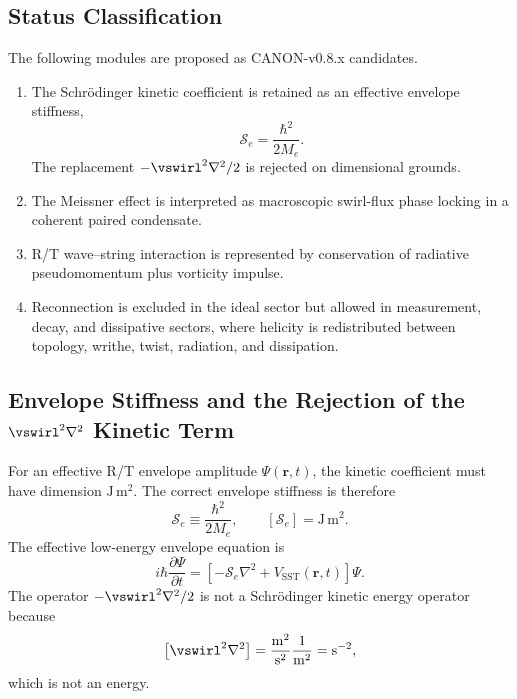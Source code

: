     \subsection{Status Classification}
        
        The following modules are proposed as CANON-v0.8.x candidates.
        
        \begin{enumerate}
            \item The Schrödinger kinetic coefficient is retained as an effective
            envelope stiffness,
            \[
                \mathcal S_e=\frac{\hbar^2}{2M_e}.
            \]
            The replacement \(-\vswirl^2\nabla^2/2\) is rejected on dimensional grounds.
            
            \item The Meissner effect is interpreted as macroscopic swirl-flux phase
            locking in a coherent paired condensate.
            
            \item R/T wave--string interaction is represented by conservation of
            radiative pseudomomentum plus vorticity impulse.
            
            \item Reconnection is excluded in the ideal sector but allowed in
            measurement, decay, and dissipative sectors, where helicity is redistributed
            between topology, writhe, twist, radiation, and dissipation.
        \end{enumerate}
    
    \subsection{Envelope Stiffness and the Rejection of the \texorpdfstring{\(\vswirl^2\nabla^2\)}{vswirl2 Laplacian} Kinetic Term}
        
        For an effective R/T envelope amplitude \(\Psi(\mathbf r,t)\), the kinetic
        coefficient must have dimension \(\mathrm{J\,m^2}\). The correct envelope
        stiffness is therefore
        \[
            \mathcal S_e
            \equiv
            \frac{\hbar^2}{2M_e},
            \qquad
            [\mathcal S_e]=\mathrm{J\,m^2}.
        \]
        The effective low-energy envelope equation is
        \[
            i\hbar\frac{\partial\Psi}{\partial t}
            =
            \left[
                -\mathcal S_e\nabla^2
            +
            V_{\mathrm{SST}}(\mathbf r,t)
            \right]\Psi .
        \]
        The operator \(-\vswirl^2\nabla^2/2\) is not a Schrödinger kinetic energy
        operator because
        \[
            \left[\vswirl^2\nabla^2\right]
            =
            \frac{\mathrm{m^2}}{\mathrm{s^2}}\frac{1}{\mathrm{m^2}}
            =
            \mathrm{s^{-2}},
        \]
        which is not an energy.
        
